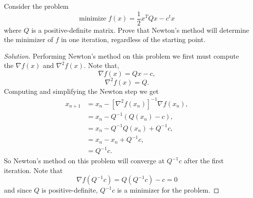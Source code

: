\documentclass[12pt]{article}
\makeatletter
\theoremstyle{homework}
\newenvironment{exercise}[1]
{\def\@currentlabel{#1}\exercisecore}
{\endexercisecore}
\makeatother
\begin{document}
\begin{exercise}{3.6} Consider the problem
  \begin{equation*}
    \text{minimize } f(x) = \frac{1}{2}x^TQx - c^tx
  \end{equation*}
  where $Q$ is a positive-definite matrix. Prove that Newton's method will determine the minimizer of $f$ in one iteration, regardless 
  of the starting point. 
    \begin{proof}[Solution] Performing Newton's method on this problem we first must compute the $\nabla f(x)$ and $\nabla^2 f(x)$.
      Note that, 
      \begin{equation*}
        \nabla f(x) = Qx - c,
      \end{equation*}
      \begin{equation*}
        \nabla^2 f(x) = Q.
      \end{equation*}
      Computing and simplifying the Newton step we get 
      \begin{align*}
        x_{n + 1} &= x_n - [\nabla^2 f(x_n)]^{-1} \nabla f(x_n),\\
         &= x_n - Q^{-1} (Q(x_n) - c),\\
         &= x_n - Q^{-1}Q(x_n) + Q^{-1}c,\\
         &= x_n - x_n + Q^{-1}c,\\
         &= Q^{-1}c.
      \end{align*}
      So Newton's method on this problem will converge at $Q^{-1}c$ after the first iteration. Note that 
      \begin{equation*}
        \nabla f(Q^{-1}c) = Q(Q^{-1}c) - c = 0
      \end{equation*}
      and since $Q$ is positive-definite, $Q^{-1}c$ is a minimizer for the problem. 
      \end{proof}
\end{exercise}
\vspace{.5in}
\end{document}

